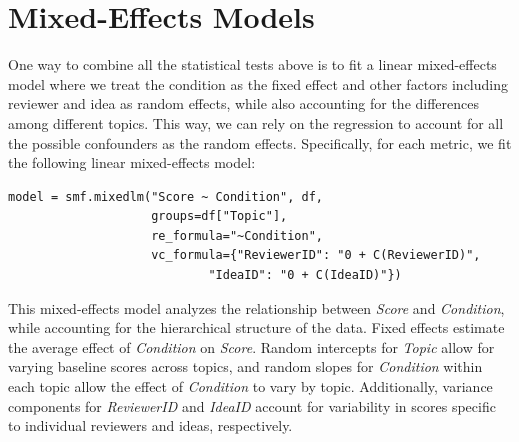 \newpage










\section{Mixed-Effects Models}
\label{sec:mixed_effects_model}

One way to combine all the statistical tests above is to fit a linear mixed-effects model where we treat the condition as the fixed effect and other factors including reviewer and idea as random effects, while also accounting for the differences among different topics. This way, we can rely on the regression to account for all the possible confounders as the random effects. 
%
Specifically, for each metric, we fit the following linear mixed-effects model:

\begin{verbatim}
model = smf.mixedlm("Score ~ Condition", df, 
                    groups=df["Topic"], 
                    re_formula="~Condition",
                    vc_formula={"ReviewerID": "0 + C(ReviewerID)", 
                            "IdeaID": "0 + C(IdeaID)"})
\end{verbatim}

This mixed-effects model analyzes the relationship between \textit{Score} and \textit{Condition}, while accounting for the hierarchical structure of the data. Fixed effects estimate the average effect of \textit{Condition} on \textit{Score}. Random intercepts for \textit{Topic} allow for varying baseline scores across topics, and random slopes for \textit{Condition} within each topic allow the effect of \textit{Condition} to vary by topic. Additionally, variance components for \textit{ReviewerID} and \textit{IdeaID} account for variability in scores specific to individual reviewers and ideas, respectively.


